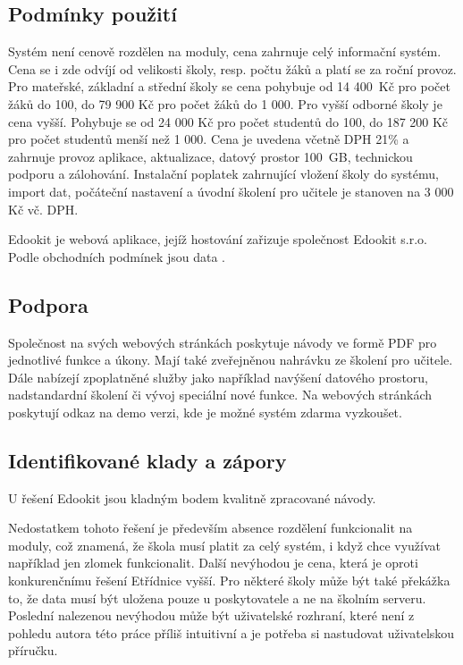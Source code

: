 \subsection{Podmínky použití}
Systém není cenově rozdělen na moduly, cena zahrnuje celý informační systém. Cena se i zde odvíjí od velikosti školy, resp. počtu žáků a platí se za roční provoz. Pro mateřské, základní a střední školy se cena pohybuje od 14 400~Kč pro počet žáků do 100, do 79 900 Kč pro počet žáků do 1 000. Pro vyšší odborné školy je cena vyšší. Pohybuje se od 24 000 Kč pro počet studentů do 100, do 187 200 Kč pro počet studentů menší než 1 000. Cena je uvedena včetně DPH 21\% a zahrnuje provoz aplikace, aktualizace, datový prostor 100~GB, technickou podporu a zálohování. Instalační poplatek zahrnující vložení školy do systému, import dat, počáteční nastavení a úvodní školení pro učitele je stanoven na 3 000 Kč vč. DPH.

Edookit je webová aplikace, jejíž hostování zařizuje společnost Edookit s.r.o. Podle obchodních podmínek \cite{edookit-podminky} jsou data .

\subsection{Podpora}
Společnost na svých webových stránkách poskytuje návody ve formě PDF pro jednotlivé funkce a úkony. Mají také zveřejněnou nahrávku ze školení pro učitele. Dále nabízejí zpoplatněné služby jako například navýšení datového prostoru, nadstandardní školení či vývoj speciální nové funkce. Na webových stránkách poskytují odkaz na demo verzi, kde je možné systém zdarma vyzkoušet.

\subsection{Identifikované klady a zápory}
U řešení Edookit jsou kladným bodem kvalitně zpracované návody.

Nedostatkem tohoto řešení je především absence rozdělení funkcionalit na moduly, což znamená, že škola musí platit za celý systém, i když chce využívat například jen zlomek funkcionalit. Další nevýhodou je cena, která je oproti konkurenčnímu řešení Etřídnice vyšší. Pro některé školy může být také překážka to, že data musí být uložena pouze u poskytovatele a ne na školním serveru. Poslední nalezenou nevýhodou může být uživatelské rozhraní, které není z pohledu autora této práce příliš intuitivní a je potřeba si nastudovat uživatelskou příručku. 

